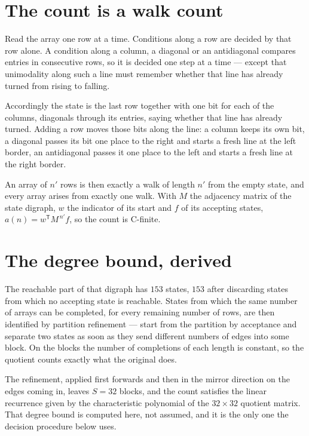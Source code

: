 \documentclass[11pt]{article}
\theoremstyle{definition}
\begin{document}
\section{The count is a walk count}

Read the array one row at a time. Conditions along a row are decided by that row alone. A condition along a column, a diagonal or an antidiagonal compares entries in consecutive rows, so it is decided one step at a time --- except that unimodality along such a line must remember whether that line has already turned from rising to falling.

Accordingly the state is the last row together with one bit for each of the columns, diagonals through its entries, saying whether that line has already turned. Adding a row moves those bits along the line: a column keeps its own bit, a diagonal passes its bit one place to the right and starts a fresh line at the left border, an antidiagonal passes it one place to the left and starts a fresh line at the right border.

An array of $n'$ rows is then exactly a walk of length $n'$ from the empty state, and every array arises from exactly one walk. With $M$ the adjacency matrix of the state digraph, $w$ the indicator of its start and $f$ of its accepting states, $a(n) = w^{\mathsf T}M^{\,n'}f$, so the count is C-finite.

\section{The degree bound, derived}

The reachable part of that digraph has $153$ states, $153$ after discarding states from which no accepting state is reachable. States from which the same number of arrays can be completed, for every remaining number of rows, are then identified by partition refinement --- start from the partition by acceptance and separate two states as soon as they send different numbers of edges into some block. On the blocks the number of completions of each length is constant, so the quotient counts exactly what the original does.

The refinement, applied first forwards and then in the mirror direction on the edges coming in, leaves $S = 32$ blocks, and the count satisfies the linear recurrence given by the characteristic polynomial of the $32 \times 32$ quotient matrix. That degree bound is computed here, not assumed, and it is the only one the decision procedure below uses.
\end{document}
